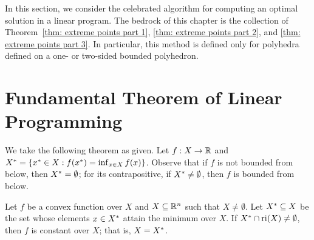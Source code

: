 
In this section, we consider the celebrated algorithm for computing an optimal solution in a linear program. The bedrock of this chapter is the collection of Theorem~\ref{thm: extreme points part 1}, \ref{thm: extreme points part 2}, and \ref{thm: extreme points part 3}. In particular, this method is defined only for polyhedra defined on a one- or two-sided bounded polyhedron. 

\section{Fundamental Theorem of Linear Programming}

We take the following theorem as given. Let $f: X\to\mathbb R$ and $X^\ast = \{x^\ast\in X: f(x^\ast) = \inf_{x\in X}f(x)\}$. Observe that if $f$ is not bounded from below, then $X^\ast = \emptyset$; for its contrapositive, if $X^\ast\neq\emptyset$, then $f$ is bounded from below. 

\begin{proposition}\label{thm: ri implies constant}
Let $f$ be a convex function over $X$ and $X\subseteq \mathbb R^{n}$ such that $X\neq \emptyset$. Let $X^\ast\subseteq X$ be the set whose elements $x\in X^\ast$ attain the minimum over $X$. If $X^\ast\cap \operatorname{ri}(X)\neq \emptyset$, then $f$ is constant over $X$; that is, $X = X^\ast$. 
\end{proposition}

